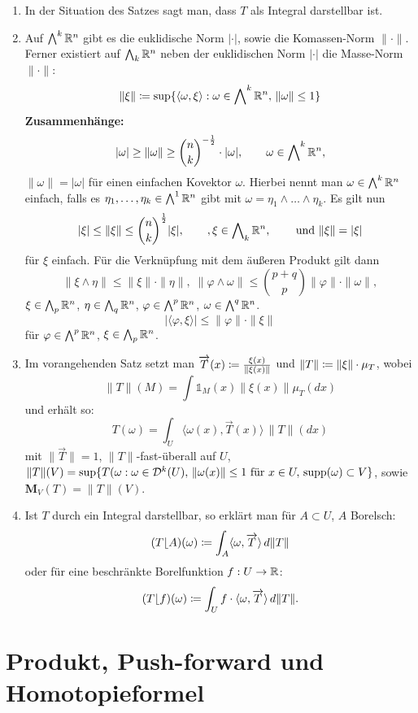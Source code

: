 \documentclass[a4paper,twoside,DIV15,BCOR12mm]{scrbook}
\newcommand{\ind}{\mathds 1}
\newcommand{\MN}{\mathbf M}
\newcommand{\bw}{\bigwedge\nolimits}
\newcommand{\MR}{\lfloor}
\newcommand{\overarrow}{\overrightarrow}
\begin{document}
\begin{bemerkung}
\begin{enumerate}[(1)]
	\item In der Situation des Satzes sagt man, dass $T$ als Integral darstellbar ist.
	\item Auf $\bw^k \MdR^n$ gibt es die euklidische Norm $|\cdot|$, sowie die Komassen-Norm $\|\cdot\|$. Ferner existiert auf $\bw_k \MdR^n$ neben der euklidischen Norm $|\cdot|$ die Masse-Norm $\|\cdot\|$:
	$$
		\|\xi\| \da \sup\{ \langle \omega,\xi \rangle : \omega \in \bw^k \MdR^n,\, \|\omega\| \leq 1 \}
	$$
	\textbf{Zusammenhänge:}
	$$
		|\omega| \geq \|\omega\| \geq {\binom n k}^{-\frac12} \cdot |\omega|,\qquad \omega \in \bw^k\MdR^n,
	$$
$\|\omega\|=|\omega|$ für einen einfachen Kovektor $\omega$. Hierbei nennt man $\omega \in \bw^k\MdR^n$ einfach, falls es $\eta_1,\dots,\eta_k \in \bw^1 \MdR^n$ gibt mit $\omega=\eta_1\wedge\dots\wedge\eta_k$. Es gilt nun
	$$
		|\xi| \leq \|\xi\| \leq {\binom n k}^{\frac12} |\xi|,\qquad, \xi \in \bw_k \MdR^n,\,\qquad\text{und } \|\xi\|=|\xi|
	$$
	für $\xi$ einfach. Für die Verknüpfung mit dem äußeren Produkt gilt dann
	$$
		\|\xi \wedge \eta\| \leq \|\xi\| \cdot \|\eta\|,\; \|\varphi \wedge \omega\| \leq \binom{p+q}p \|\varphi\| \cdot \|\omega\|,
	$$
	$\xi \in \bw_p \MdR^n$, $\eta \in \bw_q \MdR^n$, $\varphi \in \bw^p \MdR^n$, $\omega \in \bw^q \MdR^n$.
	$$
		|\langle \varphi, \xi \rangle| \leq \|\varphi\| \cdot \|\xi\|
	$$
	für $\varphi \in \bw^p\MdR^n$, $\xi \in \bw_p\MdR^n$.
	\item Im vorangehenden Satz setzt man $\overarrow T(x) \da \frac{\xi(x)}{\|\xi(x)\|}$ und $\|T\| \da \|\xi\| \cdot \mu_T$, wobei 
	$$
	\|T\|(M) = \int \ind_M(x) \|\xi(x)\| \mu_T(dx)$$ und erhält so:
	$$
		T(\omega) = \int_U \langle\omega(x),\overarrow T(x)\rangle \, \|T\|(dx)
	$$
	mit $\|\overarrow T\| = 1$, $\|T\|$-fast-überall auf $U$, $\|T\|(V) = \sup\{T(\omega : \omega \in \mathcal D^k(U),\, \|\omega(x)\| \leq 1 \text{ für } x\in U,\, \mathop{\rm supp}\nolimits(\omega) \subset V\}$, sowie $\MN_V(T) = \|T\|(V)$.
	\item Ist $T$ durch ein Integral darstellbar, so erklärt man für $A \subset U$, $A$ Borelsch:
	$$
		(T\MR A)(\omega) \da \int_A\langle \omega,\overarrow T \rangle \, d\|T\|
	$$
	oder für eine beschränkte Borelfunktion $f: U \to \mathbb{R}$:
	$$
		(T\MR f)(\omega) \da \int_U f\cdot \langle\omega,\overarrow T\rangle \, d\|T\|.
	$$
\end{enumerate}
\end{bemerkung}


\section{Produkt, Push-forward und Homotopieformel}
\end{document}

